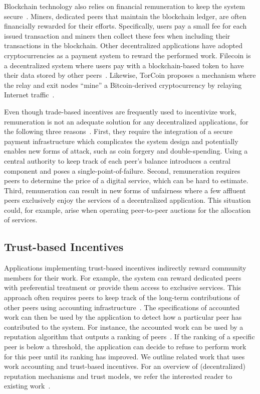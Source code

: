 Blockchain technology also relies on financial remuneration to keep the system secure~\cite{easley2019mining}.
Miners, dedicated peers that maintain the blockchain ledger, are often financially rewarded for their efforts.
Specifically, users pay a small fee for each issued transaction and miners then collect these fees when including their transactions in the blockchain.
Other decentralized applications have adopted cryptocurrencies as a payment system to reward the performed work.
Filecoin is a decentralized system where users pay with a blockchain-based token to have their data stored by other peers~\cite{benet2018filecoin}.
Likewise, TorCoin proposes a mechanism where the relay and exit nodes \enquote{mine} a Bitcoin-derived cryptocurrency by relaying Internet traffic~\cite{ghosh2014torpath}.

Even though trade-based incentives are frequently used to incentivize work, remuneration is not an adequate solution for any decentralized applications, for the following three reasons~\cite{hummel2003earning}.
First, they require the integration of a secure payment infrastructure which complicates the system design and potentially enables new forms of attack, such as coin forgery and double-spending.
Using a central authority to keep track of each peer's balance introduces a central component and poses a single-point-of-failure.
Second, remuneration requires peers to determine the price of a digital service, which can be hard to estimate.
Third, remuneration can result in new forms of unfairness where a few affluent peers exclusively enjoy the services of a decentralized application.
This situation could, for example, arise when operating peer-to-peer auctions for the allocation of services.

\subsection{Trust-based Incentives}
Applications implementing trust-based incentives indirectly reward community members for their work.
For example, the system can reward dedicated peers with preferential treatment or provide them access to exclusive services.
This approach often requires peers to keep track of the long-term contributions of other peers using accounting infrastructure~\cite{meulpolder2009bartercast}.
The specifications of accounted work can then be used by the application to detect how a particular peer has contributed to the system.
For instance, the accounted work can be used by a reputation algorithm that outputs a ranking of peers~\cite{karakaya2009free}.
If the ranking of a specific peer is below a threshold, the application can decide to refuse to perform work for this peer until its ranking has improved.
We outline related work that uses work accounting and trust-based incentives.
For an overview of (decentralized) reputation mechanisms and trust models, we refer the interested reader to existing work~\cite{hendrikx2015reputation,bellini2020blockchain}.

